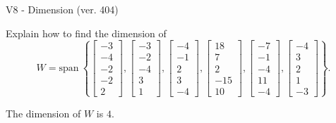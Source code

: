 \begin{exercise}
  \begin{exerciseTitle}V8 - Dimension (ver. 404)\end{exerciseTitle}
  \begin{exerciseStatement}
    Explain how to find the dimension of 
\[W=\mathrm{span}\ \left\{\left[\begin{array}{r}
-3 \\
-4 \\
-2 \\
-2 \\
2
\end{array}\right] , \left[\begin{array}{r}
-3 \\
-2 \\
-4 \\
3 \\
1
\end{array}\right] , \left[\begin{array}{r}
-4 \\
-1 \\
2 \\
3 \\
-4
\end{array}\right] , \left[\begin{array}{r}
18 \\
7 \\
2 \\
-15 \\
10
\end{array}\right] , \left[\begin{array}{r}
-7 \\
-1 \\
-4 \\
11 \\
-4
\end{array}\right] , \left[\begin{array}{r}
-4 \\
3 \\
2 \\
1 \\
-3
\end{array}\right]\right\}.\]



  \end{exerciseStatement}
  \begin{exerciseAnswer}
   The dimension of \(W\) is  \(4\).
  


  \end{exerciseAnswer}
\end{exercise}